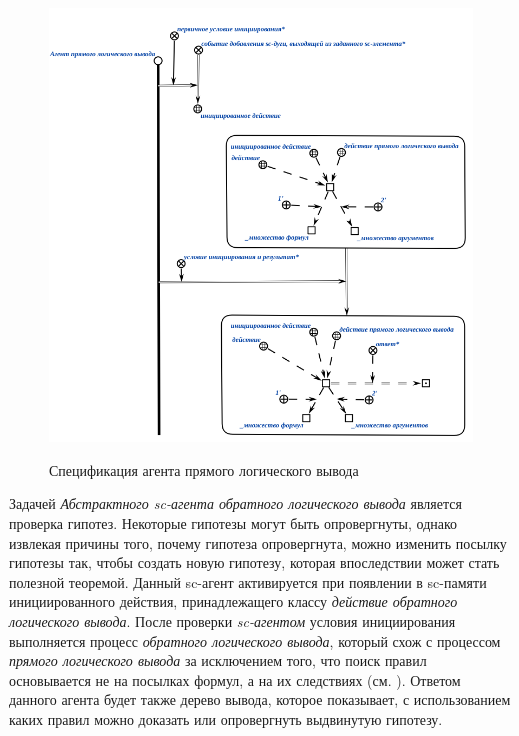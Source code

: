 \begin{figure}[H]
	\caption{Спецификация агента прямого логического вывода}
	\includegraphics[scale=0.8]{author/part3/figures/direct_inference_agent.png}
	\label{fig:direct_inference_agent}
\end{figure}

Задачей \textit{Абстрактного sc-агента обратного логического вывода} является проверка гипотез. Некоторые гипотезы могут быть опровергнуты, однако извлекая причины того, почему гипотеза опровергнута, можно изменить посылку гипотезы так, чтобы создать новую гипотезу, которая впоследствии может стать полезной теоремой. Данный sc-агент активируется при появлении в sc-памяти инициированного действия, принадлежащего классу \textit{действие обратного логического вывода}. После проверки \textit{sc-агентом} условия инициирования выполняется процесс \textit{обратного логического вывода}, который схож с процессом \textit{прямого логического вывода} за исключением того, что поиск правил основывается не на посылках формул, а на их следствиях (см. ). Ответом данного агента будет также дерево вывода, которое показывает, с использованием каких правил можно доказать или опровергнуть выдвинутую гипотезу.

